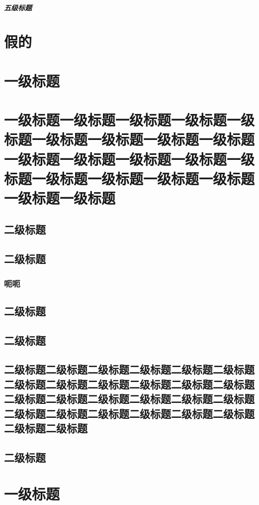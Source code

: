 \documentclass[printMode]{ecnuthesis}
\begin{document}
\paragraph{五级标题}

\chapter{假的}

\chapter{一级标题}

\chapter{一级标题一级标题一级标题一级标题一级标题一级标题一级标题一级标题一级标题一级标题一级标题一级标题一级标题一级标题一级标题一级标题一级标题一级标题一级标题一级标题}

\section{二级标题}
\section{二级标题}
\subsection{呃呃}
\section{二级标题}
\section{二级标题}
\section{二级标题二级标题二级标题二级标题二级标题二级标题二级标题二级标题二级标题二级标题二级标题二级标题二级标题二级标题二级标题二级标题二级标题二级标题二级标题二级标题二级标题二级标题二级标题二级标题二级标题二级标题}
\section{二级标题}

\chapter{一级标题}
\end{document}
